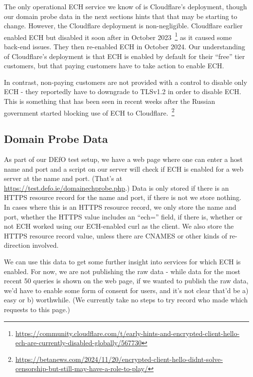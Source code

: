 The only operational ECH service we know of is Cloudflare's deployment, though
our domain probe data in the next sections hints that that may be starting to change.
However, the Cloudflare deployment is non-negligible.  Cloudflare earlier enabled ECH but disabled
it soon after in
October 2023~\footnote{\url{https://community.cloudflare.com/t/early-hints-and-encrypted-client-hello-ech-are-currently-disabled-globally/567730}}
as it caused some back-end issues. They then re-enabled ECH in October 2024.
Our understanding of Cloudflare's deployment is that ECH is enabled by 
default for their ``free'' tier customers, but that paying customers have to
take action to enable ECH.

In contrast, non-paying customers are not provided with a control to disable
only ECH - they reportedly have to downgrade to TLSv1.2 in order to disable ECH. This
is something that has been seen in recent weeks after the Russian government
started blocking use of ECH to
Cloudflare.~\footnote{\url{https://betanews.com/2024/11/20/encrypted-client-hello-didnt-solve-censorship-but-still-may-have-a-role-to-play/}}

\subsection{Domain Probe Data}

As part of our DEfO test setup, we have a web page where one can enter a host
name and port and a script on our server will check if ECH is enabled for a web
server at the name and port. (That's at
\url{https://test.defo.ie/domainechprobe.php}.) Data is only stored if there is
an HTTPS resource record for the name and port, if there is not we store
nothing. In cases where this is an HTTPS resource record, we only store the
name and port, whether the HTTPS value includes an ``ech='' field, if there is,
whether or not ECH worked using our ECH-enabled curl as the client. We also
store the HTTPS resource record value, unless there are CNAMES or other
kinds of re-direction involved.

We can use this data to get some further insight into services for which ECH
is enabled. For now, we are not publishing the raw data - while data for the most
recent 50 queries is shown on the web page, if we wanted to publish the raw
data, we'd have to enable some form of consent for users, and it's not clear
that'd be a) easy or b) worthwhile. (We currently take no steps to try record
who made which requests to this page.)

